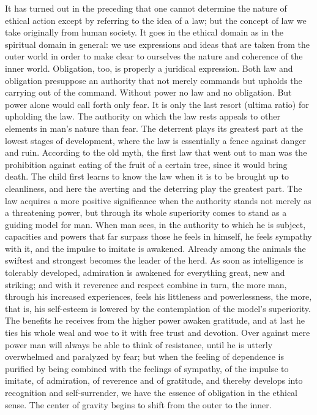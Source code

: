 \documentclass[12pt,a4paper,openany]{book}
\newcommand{\opage}[1]{\marginnote{\footnotesize\textit{[#1]}}}
\begin{document}
It has turned out in the preceding that one cannot determine the nature of
ethical action except by referring to the idea of a law; but the concept of
law we take originally from human society. It goes in the ethical domain as in
the spiritual domain in general: we use expressions and ideas that are taken
from the outer world in order to make clear to ourselves the nature and
coherence of the inner world. Obligation, too, is properly a juridical
expression. Both law and obligation presuppose an authority that not merely
commands but upholds the carrying out of the command. Without power no law and
no obligation. But power alone would call forth only fear. It is only the last
resort (ultima ratio) for upholding the law. The authority on which the law
rests appeals to other elements in man's nature than fear. The deterrent plays
its greatest part at the lowest stages of development, where the law is
essentially a fence against danger and ruin. According to the old myth, the
first law that went out to man was the prohibition against eating of the fruit
of a certain \opage{57}tree, since it would bring death. The child first
learns to know the law when it is to be brought up to cleanliness, and here
the averting and the deterring play the greatest part. The law acquires a more
positive significance when the authority stands not merely as a threatening
power, but through its whole superiority comes to stand as a guiding model for
man. When man sees, in the authority to which he is subject, capacities and
powers that far surpass those he feels in himself, he feels sympathy with it,
and the impulse to imitate is awakened. Already among the animals the swiftest
and strongest becomes the leader of the herd. As soon as intelligence is
tolerably developed, admiration is awakened for everything great, new and
striking; and with it reverence and respect combine in turn, the more man,
through his increased experiences, feels his littleness and powerlessness, the
more, that is, his self-esteem is lowered by the contemplation of the model's
superiority. The benefits he receives from the higher power awaken gratitude,
and at last he ties his whole weal and woe to it with free trust and devotion.
Over against mere power man will always be able to think of resistance, until
he is utterly overwhelmed and paralyzed by fear; but when the feeling of
dependence is purified by being combined with the feelings of sympathy, of the
impulse to imitate, of admiration, of reverence and of gratitude, and thereby
develops into recognition and self-surrender, we have the essence of
obligation \opage{58}in the ethical sense. The center of gravity begins to
shift from the outer to the inner.
\end{document}
